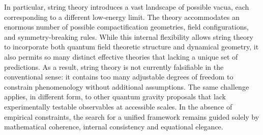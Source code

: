In particular, string theory introduces a vast landscape of possible vacua, each corresponding to a different low-energy limit. The theory accommodates an enormous number of possible compactification geometries, field configurations, and symmetry-breaking rules. While this internal flexibility allows string theory to incorporate both quantum field theoretic structure and dynamical geometry, it also permits so many distinct effective theories that lacking a unique set of predictions. As a result, string theory is not currently falsifiable in the conventional sense: it contains too many adjustable degrees of freedom to constrain phenomenology without additional assumptions. The same challenge applies, in different form, to other quantum gravity proposals that lack experimentally testable observables at accessible scales. In the absence of empirical constraints, the search for a unified framework remains guided solely by mathematical coherence, internal consistency and equational elegance.

